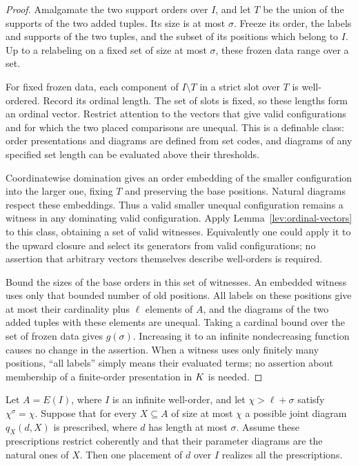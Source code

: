\begin{proof}
Amalgamate the two support orders over \(I\), and let \(T\)
be the union of the supports of the two added tuples. Its size
is at most \(\sigma\). Freeze its order, the labels and supports
of the two tuples, and the subset of its positions which belong
to \(I\). Up to a relabeling on a fixed set of size at most
\(\sigma\), these frozen data range over a set.

For fixed frozen data, each component of \(I\setminus T\) in
a strict slot over \(T\) is well-ordered. Record its ordinal
length. The set of slots is fixed, so these lengths form an
ordinal vector. Restrict attention to the vectors that give
valid configurations and for which the two placed comparisons
are unequal. This is a definable class: order presentations
and diagrams are defined from set codes, and diagrams of any
specified set length can be evaluated above their thresholds.

Coordinatewise domination gives an order embedding of the
smaller configuration into the larger one, fixing \(T\) and
preserving the base positions. Natural diagrams respect these
embeddings. Thus a valid smaller unequal configuration remains
a witness in any dominating valid configuration. Apply
Lemma~\ref{lev:ordinal-vectors} to this class, obtaining a set
of valid witnesses. Equivalently one could apply it to the
upward closure and select its generators from valid
configurations; no assertion that arbitrary vectors themselves
describe well-orders is required.

Bound the sizes of the base orders in this set of witnesses.
An embedded witness uses only that bounded number of old
positions. All labels on these positions give at most their
cardinality plus \(\ell\) elements of \(A\), and the diagrams
of the two added tuples with these elements are unequal.
Taking a cardinal bound over the set of frozen data gives
\(g(\sigma)\). Increasing it to an infinite nondecreasing
function causes no change in the assertion. When a witness
uses only finitely many positions, ``all labels'' simply means
their evaluated terms; no assertion about membership of a
finite-order presentation in \(K\) is needed.
\end{proof}

\begin{proposition}
\label{lev:compact-placement}
Let \(A=E(I)\), where \(I\) is an infinite well-order, and let
\(\chi>\ell+\sigma\) satisfy \(\chi^\sigma=\chi\). Suppose that
for every \(X\subseteq A\) of size at most \(\chi\) a possible
joint diagram \(q_X(d,X)\) is prescribed, where \(d\) has length
at most \(\sigma\). Assume these prescriptions restrict
coherently and that their parameter diagrams are the natural
ones of \(X\). Then one placement of \(d\) over \(I\) realizes
all the prescriptions.
\end{proposition}

